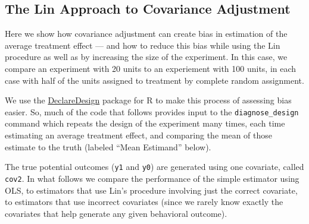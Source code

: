 \documentclass[
  12pt,
]{book}
\theoremstyle{definition}
\theoremstyle{definition}
\theoremstyle{definition}
\theoremstyle{remark}
\begin{document}
\hypertarget{the-lin-approach-to-covariance-adjustment}{%
\subsection{The Lin Approach to Covariance
Adjustment}\label{the-lin-approach-to-covariance-adjustment}}

Here we show how covariance adjustment can create bias in estimation of
the average treatment effect --- and how to reduce this bias while using
the Lin procedure as well as by increasing the size of the experiment.
In this case, we compare an experiment with 20 units to an experiement
with 100 units, in each case with half of the units assigned to
treatment by complete random assignment.

We use the \href{https://declaredesign.org/}{DeclareDesign} package for
R to make this process of assessing bias easier. So, much of the code
that follows provides input to the \texttt{diagnose\_design} command
which repeats the design of the experiment many times, each time
estimating an average treatment effect, and comparing the mean of those
estimate to the truth (labeled ``Mean Estimand'' below).

The true potential outcomes (\texttt{y1} and \texttt{y0}) are generated
using one covariate, called \texttt{cov2}. In what follows we compare
the performance of the simple estimator using OLS, to estimators that
use Lin's procedure involving just the correct covariate, to estimators
that use incorrect covariates (since we rarely know exactly the
covariates that help generate any given behavioral outcome).
\end{document}
